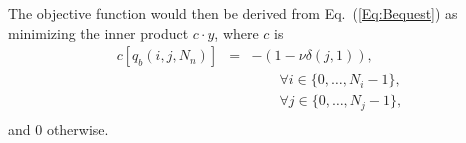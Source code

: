 \documentclass{report}[fleqn,12pt]
\begin{document}
The objective function would then be derived from Eq.~(\ref{Eq:Bequest}) as
minimizing the inner product $c\cdot y$, where $c$ is
\begin{eqnarray}
	\label{Eq:MaxBequest}
	c[q_b(i, j, N_n)] &=& -(1 - \nu\delta(j, 1)),\\
	&&\qquad\forall i \in \{0,\ldots, N_i-1\},\nonumber\\
	&&\qquad\forall j \in \{0,\ldots, N_j-1\},\nonumber\\
\end{eqnarray}
and 0 otherwise.
\end{document}
